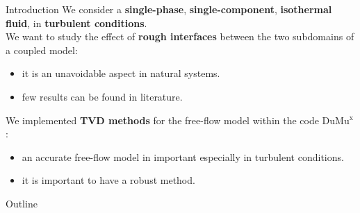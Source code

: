 \documentclass{beamer}
\newcommand{\DUMUX}{DuMu$^\mathrm{x}$\xspace} %
\begin{document}
%
\begin{frame}{Introduction}
We consider a \textbf{single-phase}, \textbf{single-component}, 
\textbf{isothermal fluid}, in \textbf{turbulent conditions}.\\
\vspace{0.3cm}
We want to study the effect of \textbf{rough interfaces} between the two 
subdomains of a coupled model:
\begin{itemize}
	\item it is an unavoidable aspect in natural systems.
	\item few results can be found in literature.
\end{itemize}
\vspace{0.3cm}
We implemented \textbf{TVD methods} for the free-flow model within the 
code \DUMUX:
\begin{itemize}
	\item an accurate free-flow model in important especially in turbulent 
	conditions.
	\item it is important to have a robust method.
\end{itemize}
\end{frame}
\begin{frame}{Outline}
	\tableofcontents
\end{frame}
\end{document}
